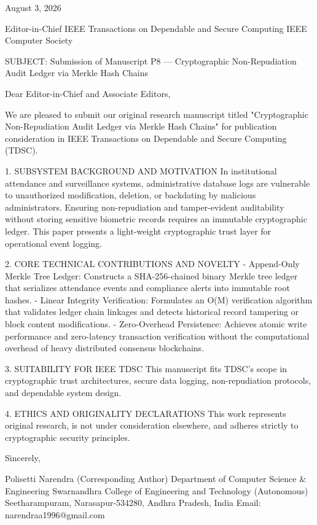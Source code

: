 August 3, 2026

Editor-in-Chief
IEEE Transactions on Dependable and Secure Computing
IEEE Computer Society

SUBJECT: Submission of Manuscript P8 — Cryptographic Non-Repudiation Audit Ledger via Merkle Hash Chains

Dear Editor-in-Chief and Associate Editors,

We are pleased to submit our original research manuscript titled "Cryptographic Non-Repudiation Audit Ledger via Merkle Hash Chains" for publication consideration in IEEE Transactions on Dependable and Secure Computing (TDSC).

1. SUBSYSTEM BACKGROUND AND MOTIVATION
In institutional attendance and surveillance systems, administrative database logs are vulnerable to unauthorized modification, deletion, or backdating by malicious administrators. Ensuring non-repudiation and tamper-evident auditability without storing sensitive biometric records requires an immutable cryptographic ledger. This paper presents a light-weight cryptographic trust layer for operational event logging.

2. CORE TECHNICAL CONTRIBUTIONS AND NOVELTY
  - Append-Only Merkle Tree Ledger: Constructs a SHA-256-chained binary Merkle tree ledger that serializes attendance events and compliance alerts into immutable root hashes.
  - Linear Integrity Verification: Formulates an O(M) verification algorithm that validates ledger chain linkages and detects historical record tampering or block content modifications.
  - Zero-Overhead Persistence: Achieves atomic write performance and zero-latency transaction verification without the computational overhead of heavy distributed consensus blockchains.

3. SUITABILITY FOR IEEE TDSC
This manuscript fits TDSC's scope in cryptographic trust architectures, secure data logging, non-repudiation protocols, and dependable system design.

4. ETHICS AND ORIGINALITY DECLARATIONS
This work represents original research, is not under consideration elsewhere, and adheres strictly to cryptographic security principles.

Sincerely,

Polisetti Narendra (Corresponding Author)
Department of Computer Science & Engineering
Swarnandhra College of Engineering and Technology (Autonomous)
Seetharampuram, Narasapur-534280, Andhra Pradesh, India
Email: narendraa1996@gmail.com
